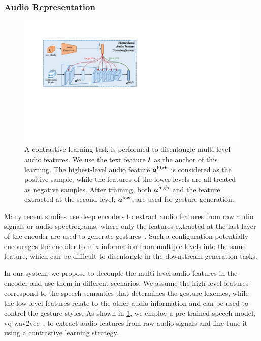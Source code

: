 \subsubsection{Audio Representation}
\label{subsubsec:audio_representation}
%
\begin{figure}[t]
    \centering
    \includegraphics[width=\linewidth]{figures/fig2a.pdf}
    \caption{A contrastive learning task is performed to disentangle multi-level audio features. We use the text feature $\bm{t}$ as the anchor of this learning. The highest-level audio feature $\bm{a}^{{\text{high}}}$ is considered as the positive sample, while the features of the lower levels are all treated as negative samples. After training, both $\bm{a}^{{\text{high}}}$ and the feature extracted at the second level, $\bm{a}^{{\text{low}}}$, are used for gesture generation.}
    \Description{}
    \label{fig:audio_feature_extraction}
\end{figure}
%
Many recent studies use deep encoders to extract audio features from raw audio signals or audio spectrograms, where only the features extracted at the last layer of the encoder are used to generate gestures~\cite{yoon2020speech,alexanderson2020style,kucherenko2020gesticulator,qian2021speech,li2021audio2gestures}. Such a configuration potentially encourages the encoder to mix information from multiple levels into the same feature, which can be difficult to disentangle in the downstream generation tasks.

In our system, we propose to decouple the multi-level audio features in the encoder and use them in different scenarios. We assume the high-level features correspond to the speech semantics that determines the gesture lexemes, while the low-level features relate to the other audio information and can be used to control the {gesture styles}. As shown in \fig\ref{fig:audio_feature_extraction}, we employ a pre-trained speech model, {vq-wav2vec}~\cite{baevski2020vq-wav2vec}, to extract audio features from raw audio signals and fine-tune it using a contrastive learning strategy.

